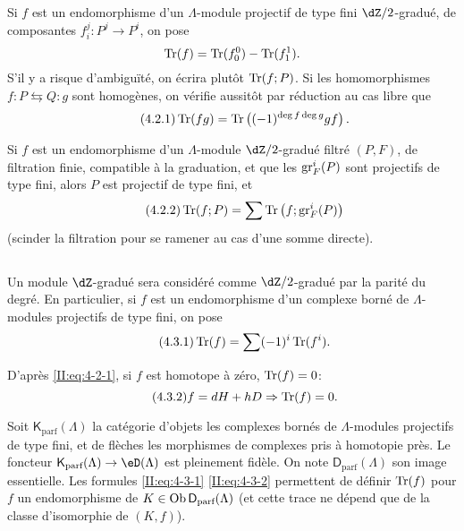 Si $f$ est un endomorphisme d'un $\Lambda$-module projectif de type fini 
$\dZ/2$-gradué, de composantes $f_i^j:P^j\to P^i$, on pose 
\[
  \operatorname{Tr}(f) = \operatorname{Tr}(f_0^0) - \operatorname{Tr}(f_1^1) \text{.}
\]
S'il y a risque d'ambiguïté, on écrira plutôt $\operatorname{Tr}(f;P)$. Si les 
homomorphismes $f:P\leftrightarrows Q:g$ sont homogènes, on vérifie 
aussitôt par réduction au cas libre que 
\begin{equation*}\tag{4.2.1}\label{II:eq:4-2-1}
  \operatorname{Tr}(f g) = \operatorname{Tr}\left((-1)^{\deg f \deg g} g f\right) \text{.}
\end{equation*}

Si $f$ est un endomorphisme d'un $\Lambda$-module $\dZ/2$-gradué filtré 
$(P,F)$, de filtration finie, compatible à la graduation, et que les 
$\operatorname{gr}_F^i(P)$ sont projectifs de type fini, alors $P$ est projectif de type 
fini, et 
\begin{equation*}\tag{4.2.2}\label{II:eq:4-2-2}
  \operatorname{Tr}(f;P) = \sum \operatorname{Tr}\left(f; \operatorname{gr}_F^i(P) \right)
\end{equation*}
(scinder la filtration pour se ramener au cas d'une somme directe). 





\subsection{}\label{II:4-3}

Un module $\dZ$-gradué sera considéré comme $\dZ/2$-gradué par la 
parité du degré. En particulier, si $f$ est un endomorphisme d'un complexe 
borné de $\Lambda$-modules projectifs de type fini, on pose 
\begin{equation*}\tag{4.3.1}\label{II:eq:4-3-1}
  \operatorname{Tr}(f) = \sum (-1)^i \operatorname{Tr}(f^i) \text{.}
\end{equation*}

D'après \eqref{II:eq:4-2-1}, si $f$ est homotope à zéro, $\operatorname{Tr}(f) = 0$: 
\begin{equation*}\tag{4.3.2}\label{II:eq:4-3-2}
  f = d H + h D \Rightarrow \operatorname{Tr}(f) = 0 \text{.}
\end{equation*}

Soit $\mathsf{K}_\text{parf}(\Lambda)$ la catégorie d'objets les complexes 
bornés de $\Lambda$-modules projectifs de type fini, et de flèches les 
morphismes de complexes pris à homotopie près. Le foncteur 
$\mathsf{K}_\text{parf}(\Lambda)\to\eD(\Lambda)$ est pleinement fidèle. On note 
$\mathsf{D}_\text{parf}(\Lambda)$ son image essentielle. Les formules 
\eqref{II:eq:4-3-1} \eqref{II:eq:4-3-2} permettent de définir $\operatorname{Tr}(f)$ pour $f$ 
un endomorphisme de $K\in\operatorname{Ob} \mathsf{D}_\text{parf}(\Lambda)$ (et cette trace ne 
dépend que de la classe d'isomorphie de $(K,f)$). 





